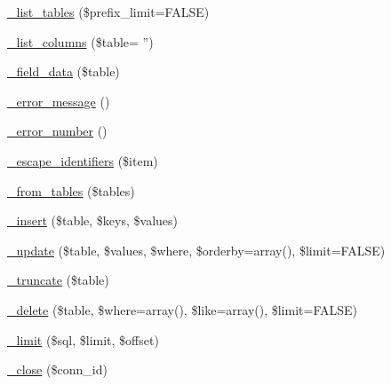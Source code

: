 \begin{DoxyCompactItemize}
\item 
\hyperlink{class_c_i___d_b__odbc__driver_a435c0f3ce54fe7daa178baa8532ebd54}{\-\_\-list\-\_\-tables} (\$prefix\-\_\-limit=F\-A\-L\-S\-E)
\item 
\hyperlink{class_c_i___d_b__odbc__driver_a2a81bb476a5c76fe6f763b0557c1e4c2}{\-\_\-list\-\_\-columns} (\$table= '')
\item 
\hyperlink{class_c_i___d_b__odbc__driver_a95247d9671893adc3444cb184ad32ea1}{\-\_\-field\-\_\-data} (\$table)
\item 
\hyperlink{class_c_i___d_b__odbc__driver_a4ca764fe1d6ad526f770f36b5f332bbb}{\-\_\-error\-\_\-message} ()
\item 
\hyperlink{class_c_i___d_b__odbc__driver_a3e48199b3a946499b7e5fba0cdfa6b86}{\-\_\-error\-\_\-number} ()
\item 
\hyperlink{class_c_i___d_b__odbc__driver_aeabfb3952399caa92a013621a98e3042}{\-\_\-escape\-\_\-identifiers} (\$item)
\item 
\hyperlink{class_c_i___d_b__odbc__driver_a885a8b4372b5c099749cefa73767a744}{\-\_\-from\-\_\-tables} (\$tables)
\item 
\hyperlink{class_c_i___d_b__odbc__driver_a69ee76b136052e0a8f06097fb388e53e}{\-\_\-insert} (\$table, \$keys, \$values)
\item 
\hyperlink{class_c_i___d_b__odbc__driver_ae869ae2275175c5ffa22816a02099d96}{\-\_\-update} (\$table, \$values, \$where, \$orderby=array(), \$limit=F\-A\-L\-S\-E)
\item 
\hyperlink{class_c_i___d_b__odbc__driver_aa029600528fc1ce660a23ff4b4667f95}{\-\_\-truncate} (\$table)
\item 
\hyperlink{class_c_i___d_b__odbc__driver_ace3cbc04a520b7811fc956cdb9ae1c19}{\-\_\-delete} (\$table, \$where=array(), \$like=array(), \$limit=F\-A\-L\-S\-E)
\item 
\hyperlink{class_c_i___d_b__odbc__driver_aeeaa5cd68dc6ace010c0b8aae89c2d15}{\-\_\-limit} (\$sql, \$limit, \$offset)
\item 
\hyperlink{class_c_i___d_b__odbc__driver_a557bd6ddde8de1f7814e10b1120efd29}{\-\_\-close} (\$conn\-\_\-id)
\end{DoxyCompactItemize}
